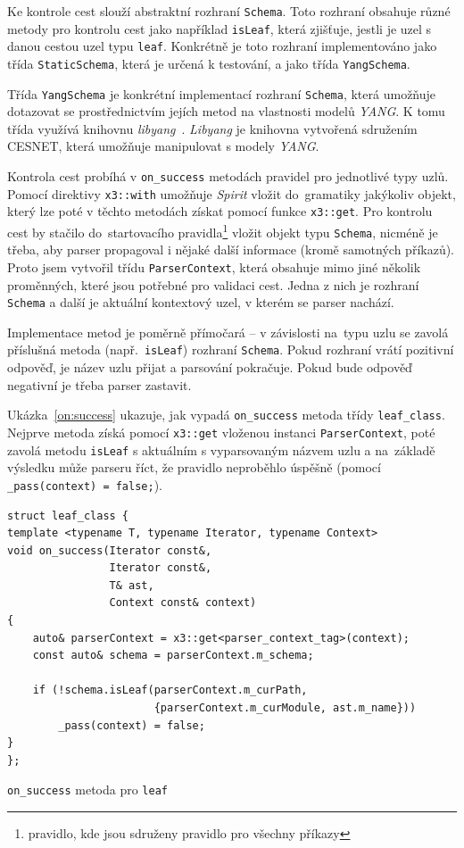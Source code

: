 \documentclass[thesis=B,czech,hidelinks]{FITthesis}[2019/03/06]
\begin{document}
Ke kontrole cest slouží abstraktní rozhraní \texttt{Schema}. Toto rozhraní obsahuje různé metody pro kontrolu cest jako například \texttt{isLeaf}, která zjišťuje, jestli je uzel s danou cestou uzel typu \texttt{leaf}. Konkrétně je toto rozhraní implementováno jako třída \texttt{StaticSchema}, která je určená k testování, a jako třída \texttt{YangSchema}.

Třída \texttt{YangSchema} je konkrétní implementací rozhraní \texttt{Schema}, která umo\-žňuje dotazovat se prostřednictvím jejích metod na vlastnosti modelů \textit{YANG}. K tomu třída využívá knihovnu \textit{libyang}~\cite{libyang}. \textit{Libyang} je knihovna vytvořená sdružením CESNET, která umožňuje manipulovat s modely \textit{YANG}.

Kontrola cest probíhá v \verb¨on_success¨ metodách pravidel pro jednotlivé typy uzlů. Pomocí direktivy \texttt{x3::with} umožňuje \textit{Spirit} vložit do~gramatiky jakýkoliv objekt, který lze poté v těchto metodách získat pomocí funkce \texttt{x3::get}. Pro kontrolu cest by stačilo do~startovacího pravidla\footnote{pravidlo, kde jsou sdruženy pravidlo pro všechny příkazy} vložit objekt typu \texttt{Schema}, nicméně je třeba, aby parser propagoval i nějaké další informace (kromě samotných příkazů). Proto jsem vytvořil třídu \texttt{ParserContext}, která obsahuje mimo jiné několik proměnných, které jsou potřebné pro validaci cest. Jedna z nich je rozhraní \texttt{Schema} a další je aktuální kontextový uzel, v kterém se parser nachází.

Implementace metod je poměrně přímočará -- v závislosti na~typu uzlu se zavolá příslušná metoda (např.\ \texttt{isLeaf}) rozhraní \texttt{Schema}. Pokud rozhraní vrátí pozitivní odpověď, je název uzlu přijat a parsování pokračuje. Pokud bude odpověď negativní je třeba parser zastavit.

Ukázka~\ref{on:success} ukazuje, jak vypadá \verb¨on_success¨ metoda třídy \texttt{leaf\_class}. Nejprve metoda získá pomocí \texttt{x3::get} vloženou instanci \texttt{ParserContext}, poté zavolá metodu \texttt{isLeaf} s aktuálním s vyparsovaným názvem uzlu a na~základě výsledku může parseru říct, že pravidlo neproběhlo úspěšně (pomocí \verb¨_pass(context) = false;¨).

\begin{listing}[H]
\begin{verbatim}
struct leaf_class {
template <typename T, typename Iterator, typename Context>
void on_success(Iterator const&,
                Iterator const&,
                T& ast,
                Context const& context)
{
    auto& parserContext = x3::get<parser_context_tag>(context);
    const auto& schema = parserContext.m_schema;

    if (!schema.isLeaf(parserContext.m_curPath,
                       {parserContext.m_curModule, ast.m_name}))
        _pass(context) = false;
}
};
\end{verbatim}
\caption{\texttt{on\_success} metoda pro \texttt{leaf}}\label{on:success}
\end{listing}
\end{document}
